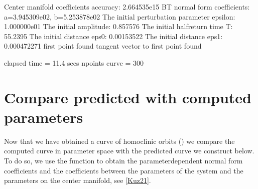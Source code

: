 \documentclass[letterpaper,10pt,english]{jupyterBook}
\begin{document}
\begin{sphinxVerbatim}[commandchars=\\\{\}]
Center manifold coefficients\PYGZsq{} accuracy: 2.664535e\PYGZhy{}15
BT normal form coefficients:
a=3.945309e\PYGZhy{}02,	 b=\PYGZhy{}5.253878e\PYGZhy{}02
The initial perturbation parameter epsilon:  1.000000e\PYGZhy{}01
The initial amplitude: 0.857576
The initial half\PYGZhy{}return time T: 55.2395
The initial distance eps0: 0.00153522
The initial distance eps1: 0.000472271
first point found
tangent vector to first point found

elapsed time  = 11.4 secs
npoints curve = 300
\end{sphinxVerbatim}


\section{Compare predicted with computed parameters}
\label{\detokenize{Bazykin:compare-predicted-with-computed-parameters}}
\sphinxAtStartPar
Now that we have obtained a curve of homoclinic orbits () we
compare the computed curve in parameter space with the predicted curve we
construct below. To do so, we use the function  to obtain the
parameter\sphinxhyphen{}dependent normal form coefficients and the coefficients between the
parameters of the system and the parameters on the center manifold, see
{[}\hyperlink{cite.references:id3}{Kuz21}{]}.
\end{document}

